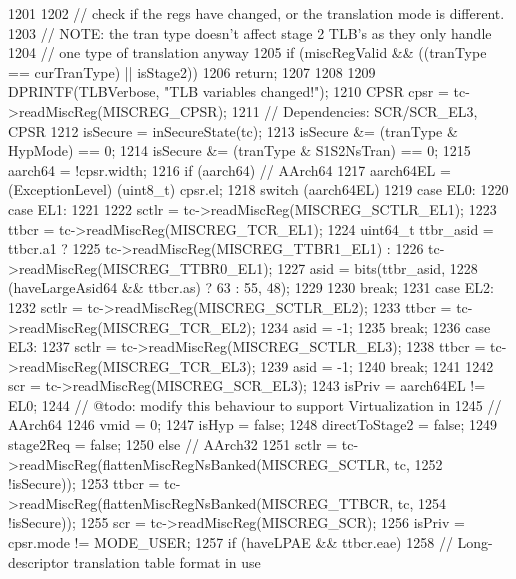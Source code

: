\begin{DoxyCode}
1201 {
1202     // check if the regs have changed, or the translation mode is different.
1203     // NOTE: the tran type doesn't affect stage 2 TLB's as they only handle
1204     // one type of translation anyway
1205     if (miscRegValid && ((tranType == curTranType) || isStage2)) {
1206         return;
1207     }
1208 
1209     DPRINTF(TLBVerbose, "TLB variables changed!\n");
1210     CPSR cpsr = tc->readMiscReg(MISCREG_CPSR);
1211     // Dependencies: SCR/SCR_EL3, CPSR
1212     isSecure  = inSecureState(tc);
1213     isSecure &= (tranType & HypMode)    == 0;
1214     isSecure &= (tranType & S1S2NsTran) == 0;
1215     aarch64 = !cpsr.width;
1216     if (aarch64) {  // AArch64
1217         aarch64EL = (ExceptionLevel) (uint8_t) cpsr.el;
1218         switch (aarch64EL) {
1219           case EL0:
1220           case EL1:
1221             {
1222                 sctlr = tc->readMiscReg(MISCREG_SCTLR_EL1);
1223                 ttbcr = tc->readMiscReg(MISCREG_TCR_EL1);
1224                 uint64_t ttbr_asid = ttbcr.a1 ?
1225                     tc->readMiscReg(MISCREG_TTBR1_EL1) :
1226                     tc->readMiscReg(MISCREG_TTBR0_EL1);
1227                 asid = bits(ttbr_asid,
1228                             (haveLargeAsid64 && ttbcr.as) ? 63 : 55, 48);
1229             }
1230             break;
1231           case EL2:
1232             sctlr = tc->readMiscReg(MISCREG_SCTLR_EL2);
1233             ttbcr = tc->readMiscReg(MISCREG_TCR_EL2);
1234             asid = -1;
1235             break;
1236           case EL3:
1237             sctlr = tc->readMiscReg(MISCREG_SCTLR_EL3);
1238             ttbcr = tc->readMiscReg(MISCREG_TCR_EL3);
1239             asid = -1;
1240             break;
1241         }
1242         scr = tc->readMiscReg(MISCREG_SCR_EL3);
1243         isPriv = aarch64EL != EL0;
1244         // @todo: modify this behaviour to support Virtualization in
1245         // AArch64
1246         vmid           = 0;
1247         isHyp          = false;
1248         directToStage2 = false;
1249         stage2Req      = false;
1250     } else {  // AArch32
1251         sctlr  = tc->readMiscReg(flattenMiscRegNsBanked(MISCREG_SCTLR, tc,
1252                                  !isSecure));
1253         ttbcr  = tc->readMiscReg(flattenMiscRegNsBanked(MISCREG_TTBCR, tc,
1254                                  !isSecure));
1255         scr    = tc->readMiscReg(MISCREG_SCR);
1256         isPriv = cpsr.mode != MODE_USER;
1257         if (haveLPAE && ttbcr.eae) {
1258             // Long-descriptor translation table format in use
}}}
\end{DoxyCode}
